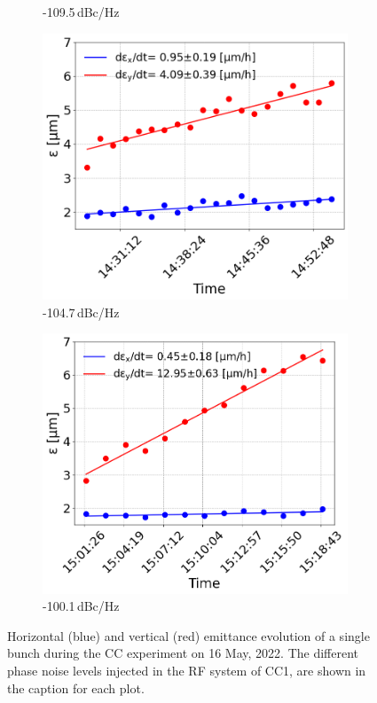 \begin{figure}[htp]
\begin{subfigure}{.45\textwidth}
       \caption{-109.5\,dBc/Hz}
       \label{fig:cc_md_2022_coast3}
   \end{subfigure}
   \begin{subfigure}{.45\textwidth}
       \centering
       \includegraphics[width=.95\linewidth]{images/Ch8/emit_vs_time_Set1_coast4.png}  
       \caption{-104.7\,dBc/Hz}
       \label{fig:cc_md_2022_coast4}
   \end{subfigure}
   \begin{subfigure}{.45\textwidth}
           \centering
           \includegraphics[width=.95\linewidth]{images/Ch8/emit_vs_time_Set1_coast5.png}  
           \caption{-100.1\,dBc/Hz}
           \label{fig:cc_md_2022_coast5}
   \end{subfigure}
   \caption{Horizontal (blue) and vertical (red) emittance evolution of a single bunch during the CC experiment on 16 May, 2022. The different phase noise levels injected in the RF system of CC1, are shown in the caption for each plot.}
   \label{fig:cc_md_2022_overview_plots_noise_scan}
\end{figure}


